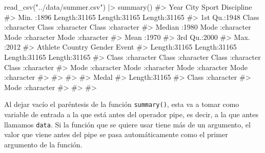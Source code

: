 \documentclass[
  letterpaper,
  DIV=11,
  numbers=noendperiod,
  oneside]{scrreprt}
\newenvironment{Shaded}{\begin{snugshade}}{\end{snugshade}}
\newcommand{\CommentTok}[1]{\textcolor[rgb]{0.37,0.37,0.37}{#1}}
\newcommand{\FunctionTok}[1]{\textcolor[rgb]{0.28,0.35,0.67}{#1}}
\newcommand{\NormalTok}[1]{\textcolor[rgb]{0.00,0.23,0.31}{#1}}
\newcommand{\SpecialCharTok}[1]{\textcolor[rgb]{0.37,0.37,0.37}{#1}}
\newcommand{\StringTok}[1]{\textcolor[rgb]{0.13,0.47,0.30}{#1}}
\begin{document}
\begin{Shaded}
\begin{Highlighting}[]
\FunctionTok{read\_csv}\NormalTok{(}\StringTok{"../data/summer.csv"}\NormalTok{) }\SpecialCharTok{|\textgreater{}} \FunctionTok{summary}\NormalTok{()}
\CommentTok{\#\textgreater{}       Year          City              Sport            Discipline       }
\CommentTok{\#\textgreater{}  Min.   :1896   Length:31165       Length:31165       Length:31165      }
\CommentTok{\#\textgreater{}  1st Qu.:1948   Class :character   Class :character   Class :character  }
\CommentTok{\#\textgreater{}  Median :1980   Mode  :character   Mode  :character   Mode  :character  }
\CommentTok{\#\textgreater{}  Mean   :1970                                                           }
\CommentTok{\#\textgreater{}  3rd Qu.:2000                                                           }
\CommentTok{\#\textgreater{}  Max.   :2012                                                           }
\CommentTok{\#\textgreater{}    Athlete            Country             Gender             Event          }
\CommentTok{\#\textgreater{}  Length:31165       Length:31165       Length:31165       Length:31165      }
\CommentTok{\#\textgreater{}  Class :character   Class :character   Class :character   Class :character  }
\CommentTok{\#\textgreater{}  Mode  :character   Mode  :character   Mode  :character   Mode  :character  }
\CommentTok{\#\textgreater{}                                                                             }
\CommentTok{\#\textgreater{}                                                                             }
\CommentTok{\#\textgreater{}                                                                             }
\CommentTok{\#\textgreater{}     Medal          }
\CommentTok{\#\textgreater{}  Length:31165      }
\CommentTok{\#\textgreater{}  Class :character  }
\CommentTok{\#\textgreater{}  Mode  :character  }
\CommentTok{\#\textgreater{}                    }
\CommentTok{\#\textgreater{}                    }
\CommentTok{\#\textgreater{} }
\end{Highlighting}
\end{Shaded}

Al dejar vacío el paréntesis de la función \texttt{summary()}, esta va a
tomar como variable de entrada a la que está antes del operador pipe, es
decir, a la que antes llamamos \texttt{data}. Si la función que se
quiere usar tiene más de un argumento, el valor que viene antes del pipe
se pasa automáticamente como el primer argumento de la función.
\end{document}
